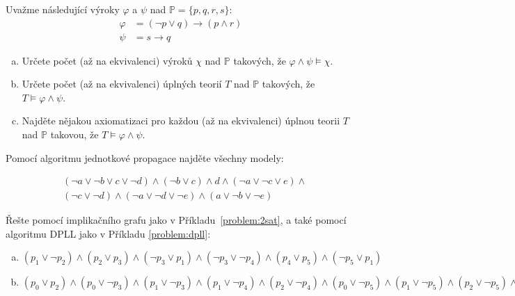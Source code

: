\begin{problem}

    Uvažme následující výroky $\varphi$ a $\psi$ nad $\mathbb P=\{p, q, r, s\}$:
    \begin{align*}
        \varphi &= (\neg p \vee  q)\to(p\wedge r)\\
        \psi &= s\to q
    \end{align*}
    \begin{enumerate}[(a)]
        \item Určete počet (až na ekvivalenci) výroků $\chi$ nad $\mathbb P$ takových, že $\varphi\wedge\psi\models\chi$.
        \item Určete počet (až na ekvivalenci) úplných teorií $T$ nad $\mathbb P$ takových, že $T\models\varphi\wedge\psi$.
        \item Najděte nějakou axiomatizaci pro každou (až na ekvivalenci) úplnou teorii $T$ nad $\mathbb P$ takovou, že $T\models\varphi\wedge\psi$.
    \end{enumerate}

\end{problem}


\begin{problem} 
    
    Pomocí algoritmu jednotkové propagace najděte všechny modely:

    \begin{align*}
    &(\neg a \vee \neg b \vee c \vee \neg d)\wedge(\neg b \vee c)\wedge d \wedge (\neg a \vee \neg c \vee e)\wedge \\
    &(\neg c \vee \neg d)\wedge(\neg a \vee \neg d \vee \neg e)\wedge(a\vee \neg b \vee\neg e)
    \end{align*}

\end{problem}

    
\begin{problem} 
    
    Řešte pomocí implikačního grafu jako v Příkladu~\ref{problem:2sat}, a také pomocí algoritmu DPLL jako v Příkladu \ref{problem:dpll}:
    \begin{enumerate}[(a)]
        \item $(p_1\vee \neg p_2)\wedge (p_2\vee p_3)\wedge (\neg p_3\vee p_1)\wedge (\neg p_3\vee \neg p_4)\wedge (p_4\vee p_5)\wedge (\neg p_5\vee p_1)$
        \item $(p_0 \vee  p_2) \wedge  (p_0 \vee  \neg p_3) \wedge  (p_1 \vee  \neg p_3) 
        \wedge  (p_1 \vee  \neg p_4) \wedge  (p_2 \vee  \neg p_4) 
        \wedge  (p_0 \vee  \neg p_5)
        \wedge 
        (p_1 \vee  \neg p_5) \wedge  (p_2 \vee  \neg p_5) \wedge  (\neg p_1 \vee  \neg p_6) \wedge  (p_4 \vee  p_6) \wedge  (p_5 \vee  p_6) \wedge  p_1\wedge \neg p_7$
    \end{enumerate}

\end{problem}



